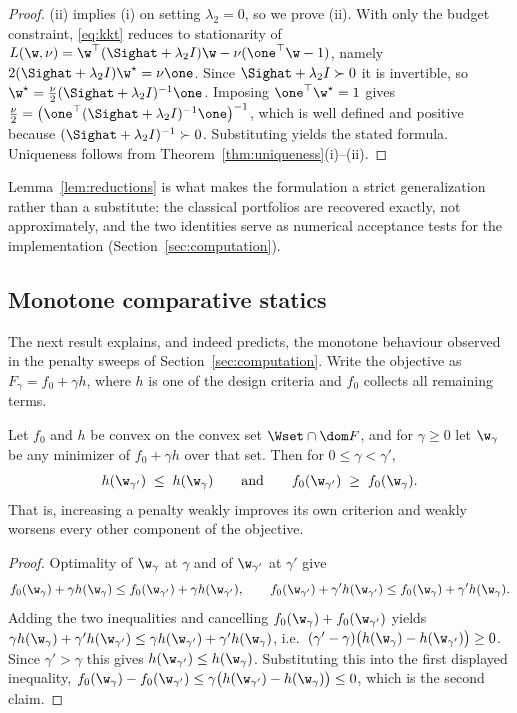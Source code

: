 \begin{proof}
(ii) implies (i) on setting $\lambda_2=0$, so we prove (ii). With only the budget
constraint, \eqref{eq:kkt} reduces to stationarity of
$L(\w,\nu)=\w^\top(\Sighat+\lambda_2I)\w-\nu(\one^\top\w-1)$, namely
$2(\Sighat+\lambda_2I)\w^\star=\nu\one$. Since $\Sighat+\lambda_2I\succ0$ it is
invertible, so $\w^\star=\tfrac{\nu}{2}(\Sighat+\lambda_2I)^{-1}\one$. Imposing
$\one^\top\w^\star=1$ gives
$\tfrac{\nu}{2}=\big(\one^\top(\Sighat+\lambda_2I)^{-1}\one\big)^{-1}$, which is
well defined and positive because $(\Sighat+\lambda_2I)^{-1}\succ0$. Substituting
yields the stated formula. Uniqueness follows from
Theorem~\ref{thm:uniqueness}(i)--(ii).
\end{proof}

Lemma~\ref{lem:reductions} is what makes the formulation a strict generalization
rather than a substitute: the classical portfolios are recovered exactly, not
approximately, and the two identities serve as numerical acceptance tests for the
implementation (Section~\ref{sec:computation}).

\subsection{Monotone comparative statics}

The next result explains, and indeed predicts, the monotone behaviour observed in
the penalty sweeps of Section~\ref{sec:computation}. Write the objective as
$F_\gamma=f_0+\gamma h$, where $h$ is one of the design criteria and $f_0$
collects all remaining terms.

\begin{theorem}
\label{thm:monotone}
Let $f_0$ and $h$ be convex on the convex set $\Wset\cap\dom F$, and for
$\gamma\ge0$ let $\w_\gamma$ be any minimizer of $f_0+\gamma h$ over that set.
Then for $0\le\gamma<\gamma'$,
\[
  h(\w_{\gamma'})\;\le\;h(\w_{\gamma})
  \qquad\text{and}\qquad
  f_0(\w_{\gamma'})\;\ge\;f_0(\w_{\gamma}).
\]
That is, increasing a penalty weakly improves its own criterion and weakly
worsens every other component of the objective.
\end{theorem}

\begin{proof}
Optimality of $\w_\gamma$ at $\gamma$ and of $\w_{\gamma'}$ at $\gamma'$ give
\[
  f_0(\w_\gamma)+\gamma h(\w_\gamma)\le f_0(\w_{\gamma'})+\gamma h(\w_{\gamma'}),
  \qquad
  f_0(\w_{\gamma'})+\gamma' h(\w_{\gamma'})\le f_0(\w_\gamma)+\gamma' h(\w_\gamma).
\]
Adding the two inequalities and cancelling $f_0(\w_\gamma)+f_0(\w_{\gamma'})$
yields $\gamma h(\w_\gamma)+\gamma'h(\w_{\gamma'})\le\gamma h(\w_{\gamma'})+\gamma'h(\w_\gamma)$,
i.e.\ $(\gamma'-\gamma)\big(h(\w_\gamma)-h(\w_{\gamma'})\big)\ge0$. Since
$\gamma'>\gamma$ this gives $h(\w_{\gamma'})\le h(\w_\gamma)$. Substituting this
into the first displayed inequality,
$f_0(\w_\gamma)-f_0(\w_{\gamma'})\le\gamma\big(h(\w_{\gamma'})-h(\w_\gamma)\big)\le0$,
which is the second claim.
\end{proof}


